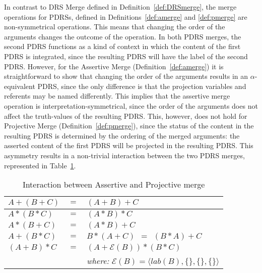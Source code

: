 \noindent In contrast to DRS Merge defined in Definition~\ref{def:DRSmerge},
the merge operations for PDRSs, defined in Definitions~\ref{def:amerge} and
\ref{def:pmerge} are non-symmetrical operations. This means that changing
the order of the arguments changes the outcome of the operation. In both
PDRS merges, the second PDRS functions as a kind of context in which the
content of the first PDRS is integrated, since the resulting PDRS will have
the label of the second PDRS. However, for the Assertive Merge
(Definition~\ref{def:amerge}) it is straightforward to show that changing
the order of the arguments results in an $\alpha$-equivalent PDRS, since the
only difference is that the projection variables and referents may be named
differently. This implies that the assertive merge operation is
interpretation-symmetrical, since the order of the arguments does not affect
the truth-values of the resulting PDRS. This, however, does not hold for
Projective Merge (Definition~\ref{def:pmerge}), since the status of the
content in the resulting PDRS is determined by the ordering of the merged
arguments: the asserted content of the first PDRS will be projected in the
resulting PDRS. This asymmetry results in a non-trivial interaction between
the two PDRS merges, represented in Table~\ref{tab:mergeinteractions}.

\begin{table}[h]
  \caption{Interaction between Assertive and Projective merge}
  \label{tab:mergeinteractions}
  \centering
  \begin{tabular}{| l c l |}
    \hline
    $A + (B + C)$ & $=$ & $(A + B) + C$\\
    \hline
    $A * (B * C)$ & $=$ & $(A * B) * C$\\
    \hline
    $A * (B + C)$ & $=$ & $(A * B) + C$\\
    \hline
    $A + (B * C)$ & $=$ & $B * (A + C) ~~=~~ (B * A) + C$\\
    \hline\hline
    $(A + B) * C$ & $=$ &  $(A + \mathcal{E}(B)) * (B * C)$\\
                  &&  \textit{where:} $\mathcal{E}(B) = \langle lab(B), \{\}, \{\}, \{\}\rangle$\\
    \hline
  \end{tabular}
\end{table}

